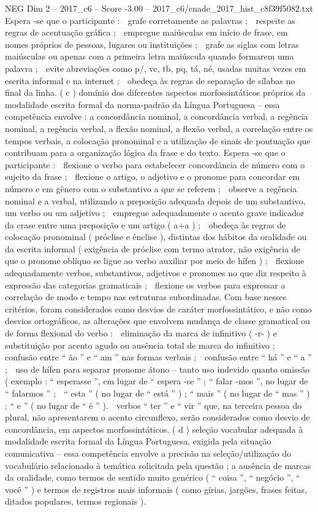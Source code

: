 \begin{textsample}{NEG Dim 2 – 2017\_c6 – Score -3.00 – 2017\_c6/enade\_2017\_hist\_c8f39f5082.txt}
Espera -se que o participante :  grafe corretamente as palavras ;  respeite as regras de acentuação gráfica ;  empregue maiúsculas em início de frase, em nomes próprios de pessoas, lugares ou instituições ;  grafe as siglas com letras maiúsculas ou apenas com a primeira letra maiúscula quando formarem uma palavra ;  evite abreviações como p/, vc, tb, pq, tá, né, usadas muitas vezes em escrita informal e na internet ;  obedeça às regras de separação de sílabas no final da linha. ( c ) domínio dos diferentes aspectos morfossintáticos próprios da modalidade escrita formal da norma-padrão da Língua Portuguesa – essa competência envolve : a concordância nominal, a concordância verbal, a regência nominal, a regência verbal, a flexão nominal, a flexão verbal, a correlação entre os tempos verbais, a colocação pronominal e a utilização de sinais de pontuação que contribuam para a organização lógica da frase e do texto.
Espera -se que o participante :  flexione o verbo para estabelecer concordância de número com o sujeito da frase ;  flexione o artigo, o adjetivo e o pronome para concordar em número e em gênero com o substantivo a que se referem ;  observe a regência nominal e a verbal, utilizando a preposição adequada depois de um substantivo, um verbo ou um adjetivo ;  empregue adequadamente o acento grave indicador da crase entre uma preposição e um artigo ( a+a ) ;  obedeça às regras de colocação pronominal ( próclise e ênclise ), distintas dos hábitos da oralidade ou da escrita informal ( exigência de próclise com termo atrator, não exigência de que o pronome oblíquo se ligue ao verbo auxiliar por meio de hífen ) ;  flexione adequadamente verbos, substantivos, adjetivos e pronomes no que diz respeito à expressão das categorias gramaticais ;  flexione os verbos para expressar a correlação de modo e tempo nas estruturas subordinadas.
Com base nesses critérios, foram considerados como desvios de caráter morfossintático, e não como desvios ortográficos, as alterações que envolvem mudança de classe gramatical ou de forma flexional do verbo :  eliminação da marca de infinitivo ( -r- ) e substituição por acento agudo ou ausência total de marca do infinitivo ;  confusão entre “ ão ” e “ am ” nas formas verbais ;  confusão entre “ há ” e “ a ” ;  uso de hífen para separar pronome átono – tanto uso indevido quanto omissão ( exemplo : “ esperasse ”, em lugar de “ espera -se ” ; “ falar -mos ”, no lugar de “ falarmos ” ;  “ esta ” ( no lugar de “ está ” ) ; “ mais ” ( no lugar de “ mas ” ) ; “ e ” ( no lugar de “ é ” ).  verbos “ ter ” e “ vir ” que, na terceira pessoa do plural, não apresentarem o acento circunflexo, serão considerados como desvio de concordância, em aspectos morfossintáticos. ( d ) seleção vocabular adequada à modalidade escrita formal da Língua Portuguesa, exigida pela situação comunicativa – essa competência envolve a precisão na seleção/utilização do vocabulário relacionado à temática solicitada pela questão ; a ausência de marcas da oralidade, como termos de sentido muito genérico ( “ coisa ”, “ negócio ”, “ você ” ) e termos de registros mais informais ( como gírias, jargões, frases feitas, ditados populares, termos regionais ).

\end{textsample}
